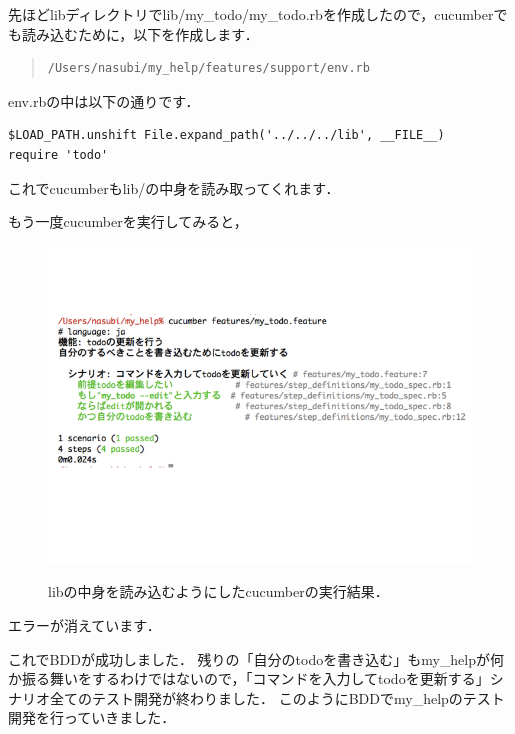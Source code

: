 先ほどlibディレクトリでlib/my\_todo/my\_todo.rbを作成したので，cucumberでも読み込むために，以下を作成します．
\begin{quote}\begin{verbatim}
/Users/nasubi/my_help/features/support/env.rb
\end{verbatim}\end{quote}
env.rbの中は以下の通りです．
\begin{lstlisting}[style=customRuby,basicstyle={\scriptsize\ttfamily}]
$LOAD_PATH.unshift File.expand_path('../../../lib', __FILE__)
require 'todo'
\end{lstlisting}
これでcucumberもlib/の中身を読み取ってくれます．

もう一度cucumberを実行してみると，

\begin{figure}[htbp]\begin{center}
\includegraphics[width=12cm,bb= 0 0 937 753]{../figs/./cucumber05.001.jpg}
\caption{libの中身を読み込むようにしたcucumberの実行結果．}
\label{fig:cucumber05}
\label{default}\end{center}\end{figure}
エラーが消えています．

これでBDDが成功しました．
残りの「自分のtodoを書き込む」もmy\_helpが何か振る舞いをするわけではないので，「コマンドを入力してtodoを更新する」シナリオ全てのテスト開発が終わりました．
このようにBDDでmy\_helpのテスト開発を行っていきました．

